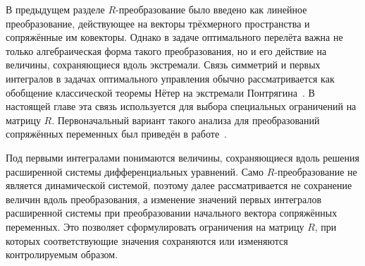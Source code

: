 В предыдущем разделе \(R\)-преобразование было введено как линейное преобразование, действующее на векторы трёхмерного пространства и сопряжённые им ковекторы. Однако в задаче оптимального перелёта важна не только алгебраическая форма такого преобразования, но и его действие на величины, сохраняющиеся вдоль экстремали. Связь симметрий и первых интегралов в задачах оптимального управления обычно рассматривается как обобщение классической теоремы Нётер на экстремали Понтрягина~\cite{torres_noether_2002}. В настоящей главе эта связь используется для выбора специальных ограничений на матрицу \(R\). Первоначальный вариант такого анализа для преобразований сопряжённых переменных был приведён в работе~\cite{korneev_affine_transformations_2025}.

Под первыми интегралами понимаются величины, сохраняющиеся вдоль решения расширенной системы дифференциальных уравнений. Само \(R\)-преобразование не является динамической системой, поэтому далее рассматривается не сохранение величин вдоль преобразования, а изменение значений первых интегралов расширенной системы при преобразовании начального вектора сопряжённых переменных. Это позволяет сформулировать ограничения на матрицу \(R\), при которых соответствующие значения сохраняются или изменяются контролируемым образом.

